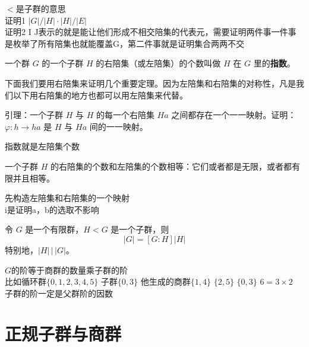 \begin{note}[命题1 34 1 35嵌套子群的陪集]
$<$是子群的意思 \\
证明1 $|G|/|H|\cdot|H|/|E|$ \\
证明2 I J表示的就是能让他们形成不相交陪集的代表元，需要证明两件事一件事是枚举了所有陪集也就能覆盖G，第二件事就是证明集合两两不交
\end{note}

\begin{definition}[商集与指数（定义 1.28）]
一个群 $G$ 的一个子群 $H$ 的右陪集（或左陪集）的个数叫做 $H$ 在 $G$ 里的\textbf{指数}。

下面我们要用右陪集来证明几个重要定理。因为左陪集和右陪集的对称性，凡是我们以下用右陪集的地方也都可以用左陪集来代替。

引理：一个子群 $H$ 与 $H$ 的每一个右陪集 $Ha$ 之间都存在一个一一映射。证明：$\varphi:h\to ha$ 是 $H$ 与 $Ha$ 间的一一映射。
\end{definition}

\begin{note}[定义1 28商集与指数]
指数就是左陪集个数
\end{note}

\begin{theorem}[定理 1：左右陪集个数相等]
一个子群 $H$ 的右陪集的个数和左陪集的个数相等：它们或者都是无限，或者都有限并且相等。
\end{theorem}

\begin{note}[定理1 左右陪集个数相等]
先构造左陪集和右陪集的一个映射 \\
i是证明a，b的选取不影响
\end{note}

\begin{theorem}[拉格朗日定理（定理 1.1）]
令 $G$ 是一个有限群，$H<G$ 是一个子群，则
\[
|G|=[G:H]|H|
\]
特别地，$|H|\,\big|\,|G|$。
\end{theorem}

\begin{note}[拉格朗日定理]
$G$的阶等于商群的数量乘子群的阶 \\
比如循环群$\{0,1,2,3,4,5\}$ 子群$\{0,3\}$ 他生成的商群$\{1,4\}$ $\{2,5\}$ $\{0,3\}$ $6=3\times2$ \\
子群的阶一定是父群阶的因数
\end{note}

\section{正规子群与商群}

